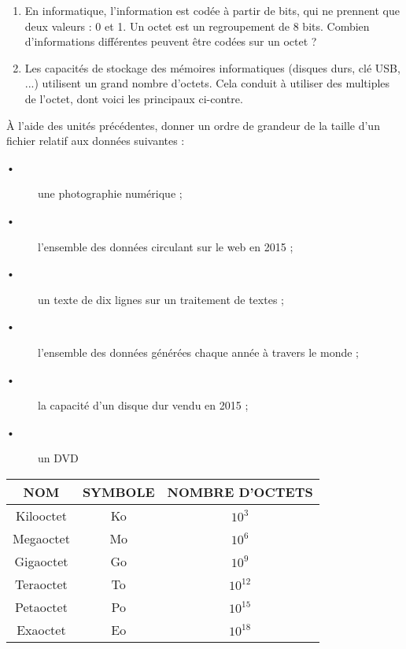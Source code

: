 
\begin{minipage}{0.48\linewidth}

\begin{enumerate}
\item En informatique, l'information est codée à partir de bits, qui ne prennent que deux valeurs : 0 et 1. Un octet est un regroupement de 8 bits. Combien d'informations différentes peuvent être codées sur un octet ?
\item Les capacités de stockage des mémoires informatiques (disques durs, clé USB, ...) utilisent un grand nombre d'octets. Cela conduit à utiliser des multiples de l'octet, dont voici les principaux ci-contre.
\end{enumerate}

À l'aide des unités précédentes, donner un ordre de grandeur de la taille d'un fichier relatif aux données suivantes :
\begin{description}
\item[•] une photographie numérique ;
\item[•] l’ensemble des données circulant sur le web en 2015 ;
\item[•] un texte de dix lignes sur un traitement de textes ;
\item[•] l’ensemble des données générées chaque année à travers le monde ;
\item[•] la capacité d’un disque dur vendu en 2015 ;
\item[•] un DVD
\end{description}

\end{minipage}
\hfill
\begin{minipage}{0.48\linewidth}

\begin{center}
\begin{tabular}{|c|c|c|}
\hline 
NOM & SYMBOLE & NOMBRE D'OCTETS \\ 
\hline 
Kilooctet & Ko & $10^{3}$ \\ 
\hline 
Megaoctet & Mo & $10^{6}$  \\ 
\hline 
Gigaoctet& Go & $10^{9}$  \\ 
\hline 
Teraoctet & To & $10^{12}$  \\ 
\hline 
Petaoctet & Po & $10^{15}$  \\ 
\hline 
Exaoctet & Eo & $10^{18}$  \\ 
\hline 
\end{tabular} 
\end{center}

\end{minipage}


